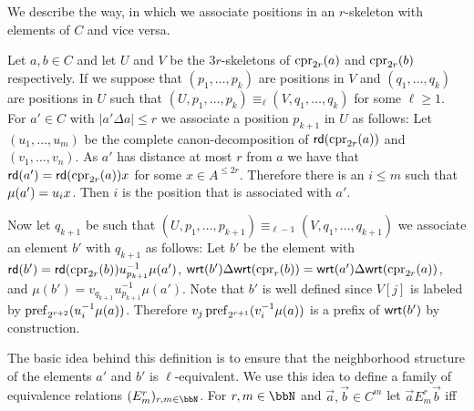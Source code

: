 We describe the way, in which we associate positions in an $r$-skeleton with elements of $C$ and vice versa. 
\begin{definition}
	Let $a,b\in C$ and let $U$ and $V$ be the $3r$-skeletons of $\operatorname{cpr}_{2r}(a)$ and $\operatorname{cpr}_{2r}(b)$ respectively. If we suppose that $(p_1,\ldots,p_k)$ are positions in $V$ and $(q_1,\ldots,q_k)$ are positions in $U$ such that $(U,p_1,\ldots,p_k) \equiv_{\ell} (V,q_1,\ldots,q_k)$ for some $\ell \geq 1$. For $a'\in C$ with $|a'\Delta a| \leq r$ we associate a position $p_{k+1}$ in $U$ as follows:
	Let $(u_1,\ldots, u_m)$ be the complete canon-decomposition of $\mathsf{rd}(\operatorname{cpr}_{2r}(a))$ and $(v_1,\ldots,v_n)$. As $a'$ has distance at most $r$ from $a$ we have that $\mathsf{rd}(a') = \mathsf{rd}(\operatorname{cpr}_{2r}(a))x$
	for some $x\in A^{\leq 2r}$. Therefore there is an $i\leq m$ such that $\mu(a') = u_ix$. Then $i$ is the position that is associated with $a'$.
	
	Now let $q_{k+1}$ be such that $(U,p_1,\ldots,p_{k+1}) \equiv_{\ell-1} (V,q_1,\ldots,q_{k+1})$ we associate an element $b'$ with $q_{k+1}$ as follows:
	Let $b'$ be the element with $\mathsf{rd}(b') = \mathsf{rd}(\operatorname{cpr}_{2r}(b))u_{p_{k+1}}^{-1}\mu(a')$, $\mathsf{wrt}(b')\Delta\mathsf{wrt}(\operatorname{cpr}_r({b})) = \mathsf{wrt}(a')\Delta\mathsf{wrt}(\operatorname{cpr}_{2r}({a}))$, and 
	$\mu(b') = v_{q_{k+1}}u_{p_{k+1}}^{-1}\mu(a')$. Note that $b'$ is well defined since $V[j]$ is labeled by $\operatorname{pref}_{2^{r+2}}(u_i^{-1}\mu({a}))$. Therefore $v_j\operatorname{pref}_{2^{r+1}}(v_i^{-1}\mu(a))$ is a prefix of $\mathsf{wrt}(b')$ by construction.
\end{definition}
The basic idea behind this definition is to ensure that the neighborhood structure of the elements $a'$ and $b'$ is $\ell$-equivalent. We use this idea to  define a family of  equivalence relations $(E^r_m)_{r,m\in\bbN}$.
For $r,m\in \bbN$ and $\vec{a},\vec{b}\in C^m$ let $\vec{a} E^r_m \vec{b}$ iff
